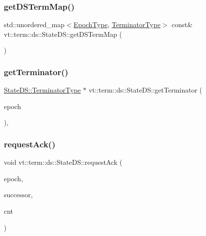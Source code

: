 \subsubsection{\texorpdfstring{get\+D\+S\+Term\+Map()}{getDSTermMap()}}
{\footnotesize\ttfamily std\+::unordered\+\_\+map$<$\hyperlink{namespacevt_a985a5adf291c34a3ca263b3378388236}{Epoch\+Type}, \hyperlink{structvt_1_1term_1_1ds_1_1_state_d_s_af98cfe31c25f710273ee103026d538e4}{Terminator\+Type}$>$ const\& vt\+::term\+::ds\+::\+State\+D\+S\+::get\+D\+S\+Term\+Map (\begin{DoxyParamCaption}{ }\end{DoxyParamCaption})\hspace{0.3cm}{\ttfamily [inline]}}

\mbox{\label{structvt_1_1term_1_1ds_1_1_state_d_s_a291452cba8050d7a5e377b1e86c3f42a}} 
\subsubsection{\texorpdfstring{get\+Terminator()}{getTerminator()}}
{\footnotesize\ttfamily \hyperlink{structvt_1_1term_1_1ds_1_1_state_d_s_af98cfe31c25f710273ee103026d538e4}{State\+D\+S\+::\+Terminator\+Type} $\ast$ vt\+::term\+::ds\+::\+State\+D\+S\+::get\+Terminator (\begin{DoxyParamCaption}\item[{\hyperlink{namespacevt_a985a5adf291c34a3ca263b3378388236}{Epoch\+Type} const \&}]{epoch }\end{DoxyParamCaption})\hspace{0.3cm}{\ttfamily [static]}, {\ttfamily [private]}}

\mbox{\label{structvt_1_1term_1_1ds_1_1_state_d_s_acdf0151492a1e35c6565c65b138e8ac9}} 
\subsubsection{\texorpdfstring{request\+Ack()}{requestAck()}}
{\footnotesize\ttfamily void vt\+::term\+::ds\+::\+State\+D\+S\+::request\+Ack (\begin{DoxyParamCaption}\item[{\hyperlink{namespacevt_a985a5adf291c34a3ca263b3378388236}{Epoch\+Type}}]{epoch,  }\item[{\hyperlink{structvt_1_1term_1_1ds_1_1_state_d_s_aba302de614dd639f5d93f4f5b6dd6108}{Endpoint}}]{successor,  }\item[{int64\+\_\+t}]{cnt }\end{DoxyParamCaption})\hspace{0.3cm}{\ttfamily [static]}}

